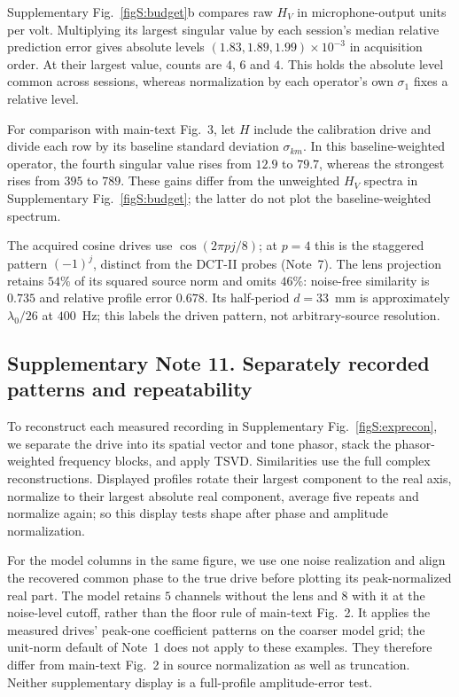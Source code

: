 \documentclass[pdflatex,sn-nature]{sn-jnl}%
\begin{document}
Supplementary Fig.~\ref{figS:budget}b compares raw $H_V$ in microphone-output
units per volt. Multiplying its largest singular value by each session's
median relative prediction error gives absolute levels
$(1.83,1.89,1.99)\times10^{-3}$ in acquisition order.
At their largest value, counts are $4$, $6$ and $4$. This holds the absolute level common across sessions, whereas normalization by each operator's own $\sigma_1$ fixes a relative level.

For comparison with main-text Fig.~3, let $H$ include the calibration drive and divide each row by its baseline standard deviation $\sigma_{km}$. In this baseline-weighted operator, the fourth singular value rises from $12.9$ to $79.7$, whereas the strongest rises from $395$ to $789$. These gains differ from the unweighted $H_V$ spectra in Supplementary Fig.~\ref{figS:budget}; the latter do not plot the baseline-weighted spectrum.

The acquired cosine drives use $\cos(2\pi p j/8)$; at $p=4$ this is the
staggered pattern $(-1)^j$, distinct from the DCT-II probes (Note~7).
The lens projection retains $54\%$ of its squared source norm and omits
$46\%$: noise-free similarity is $0.735$ and relative profile error $0.678$.
Its half-period $d=33$~mm is approximately $\lambda_0/26$ at $400$~Hz;
this labels the driven pattern, not arbitrary-source resolution.


\subsection*{Supplementary Note 11. Separately recorded patterns and repeatability}

To reconstruct each measured recording in Supplementary Fig.~\ref{figS:exprecon}, we separate the drive into its spatial vector and tone phasor, stack the phasor-weighted frequency blocks, and apply TSVD.
Similarities use the full complex reconstructions. Displayed profiles
rotate their largest component to the real axis, normalize to their
largest absolute real component, average five repeats and normalize again;
so this display tests shape after phase and amplitude normalization.

For the model columns in the same figure, we use one noise realization and align the recovered common phase to the true drive before plotting its peak-normalized real part. The model retains $5$ channels without the lens and $8$ with it at the noise-level cutoff, rather than the floor rule of main-text Fig.~2. It applies the measured drives' peak-one coefficient patterns on the coarser model grid; the unit-norm default of Note~1 does not apply to these examples. They therefore differ from main-text Fig.~2 in source normalization as well as truncation. Neither supplementary display is a full-profile amplitude-error test.
\end{document}
